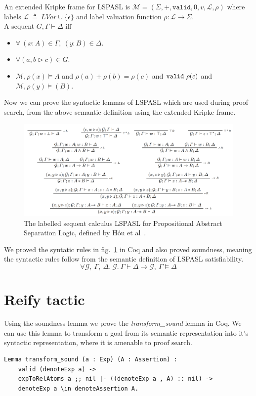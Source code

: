 \documentclass[12pt,lettersize]{article}
\begin{document}
An extended Kripke frame for LSPASL is $\mathcal{M} = (\Sigma, +, \texttt{valid}, 0, v, \mathcal{L}, \rho)$ where
labels $\mathcal{L}\ \triangleq \ LVar \cup \{ \epsilon \}$ and
label valuation function $\rho: \mathcal{L} \to \Sigma$. \\

\noindent A sequent $G, \Gamma \vdash \Delta$ iff
\begin{itemize}
\item $\forall\ (x: A) \in \Gamma,\ (y: B) \in \Delta$.
\item $\forall (a, b \triangleright c) \in G$.
\item $\mathcal{M}, \rho(x) \vDash A$ and
      $\rho(a) + \rho(b) = \rho(c)$ and $\texttt{valid}\ \rho(c)$ and
      $\mathcal{M}, \rho(y) \vDash(B) $.
\end{itemize}

Now we can prove the syntactic lemmas of LSPASL which are used during proof search, from the above semantic definition using the extended Kripke frame.

\begin{figure}
\includegraphics[width=\textwidth]{LSPASLtrans.png}
\caption{The labelled sequent calculus LSPASL for Propositional Abstract Separation Logic, defined by H\'{o}u et al~\cite{hou2017proof}.}
\label{fig:lspasl}
\end{figure}

We proved the syntatic rules in fig.~\ref{fig:lspasl} in Coq and also proved soundness, meaning the syntactic rules follow from the semantic definition
of LSPASL satisfiability.
$$ \forall \mathcal{G}, \ \Gamma,\ \Delta. \ \mathcal{G}.\ \Gamma \vdash \Delta  \to  \mathcal{G},\ \Gamma \vDash \Delta $$

\section{Reify tactic}

Using the soundness lemma we prove the \emph{transform\_sound} lemma in Coq. We can use this lemma to transform a goal from
its semantic representation into it's syntactic representation, where it is amenable to proof search.
\begin{lstlisting}[style=coq]
Lemma transform_sound (a : Exp) (A : Assertion) :
    valid (denoteExp a) ->
    expToRelAtoms a ;; nil |- ((denoteExp a , A) :: nil) ->
    denoteExp a \in denoteAssertion A.
\end{lstlisting}
\end{document}
